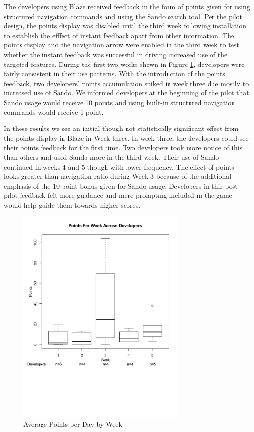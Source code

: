 \documentclass{sig-alternate}
\begin{document}
The developers using Blaze received feedback in the form of points given for using structured navigation commands and using the Sando search tool\cite{Shepherd2012Sando}.  Per the pilot design, the points display was disabled until the third week following installation to establish the efffect of instant feedback apart from other information.  The points display and the navigation arrow were enabled in the third week to test whether the instant feedback was successful in driving increased use of the targeted features. During the first two weeks shown in Figure \ref{fig:pointsbyweek}, developers were fairly consistent in their use patterns.  With the introduction of the points feedback, two developers' points accumulation spiked in week three due mostly to increased use of Sando.   We informed developers at the beginning of the pilot that Sando usage would receive 10 points and using built-in structured navigation commands would receive 1 point.  

In these results we see an initial though not statistically significant effect from the points display in Blaze in Week three.  In week three, the developers could see their points feedback for the first time.  Two developers took more notice of this than others and used Sando more in the third week.  Their use of Sando continued in weeks 4 and 5 though with lower frequency.   The effect of points looks greater than navigation ratio during Week 3 because of the additional emphasis of the 10 point bonus given for Sando usage.  Developers in thir post-pilot feedback felt more guidance and more prompting included in the game would help guide them towards higher scores.

\begin{figure}
	\includegraphics[width=3.3in]{pointsbyweek_ann.pdf}
	\caption{Average Points per Day by Week}
	\label{fig:pointsbyweek}
\end{figure}
\end{document}
